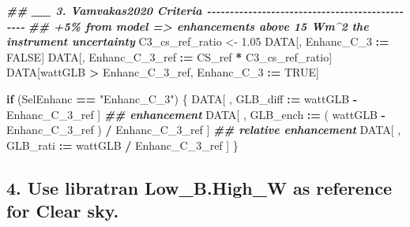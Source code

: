 \documentclass[
  10pt,
  a4paper,oneside]{article}
\newenvironment{Shaded}{\begin{snugshade}}{\end{snugshade}}
\newcommand{\ConstantTok}[1]{\textcolor[rgb]{0.56,0.35,0.01}{#1}}
\newcommand{\ControlFlowTok}[1]{\textcolor[rgb]{0.13,0.29,0.53}{\textbf{#1}}}
\newcommand{\DocumentationTok}[1]{\textcolor[rgb]{0.56,0.35,0.01}{\textbf{\textit{#1}}}}
\newcommand{\FloatTok}[1]{\textcolor[rgb]{0.00,0.00,0.81}{#1}}
\newcommand{\NormalTok}[1]{#1}
\newcommand{\OtherTok}[1]{\textcolor[rgb]{0.56,0.35,0.01}{#1}}
\newcommand{\SpecialCharTok}[1]{\textcolor[rgb]{0.81,0.36,0.00}{\textbf{#1}}}
\newcommand{\StringTok}[1]{\textcolor[rgb]{0.31,0.60,0.02}{#1}}
\begin{document}
\begin{Shaded}
\begin{Highlighting}[]
\DocumentationTok{\#\# \_\_ 3. Vamvakas2020  Criteria  {-}{-}{-}{-}{-}{-}{-}{-}{-}{-}{-}{-}{-}{-}{-}{-}{-}{-}{-}{-}{-}{-}{-}{-}{-}{-}{-}{-}{-}{-}{-}{-}{-}{-}{-}{-}{-}{-}{-}{-}{-}{-}{-}{-}{-}{-}{-}}
\DocumentationTok{\#\# +5\% from model =\textgreater{} enhancements above 15 Wm\^{}2 the instrument uncertainty}
\NormalTok{C3\_cs\_ref\_ratio }\OtherTok{\textless{}{-}} \FloatTok{1.05}
\NormalTok{DATA[, Enhanc\_C\_3 }\SpecialCharTok{:=} \ConstantTok{FALSE}\NormalTok{]}
\NormalTok{DATA[, Enhanc\_C\_3\_ref }\SpecialCharTok{:=}\NormalTok{ CS\_ref }\SpecialCharTok{*}\NormalTok{ C3\_cs\_ref\_ratio]}
\NormalTok{DATA[wattGLB }\SpecialCharTok{\textgreater{}}\NormalTok{ Enhanc\_C\_3\_ref,}
\NormalTok{     Enhanc\_C\_3 }\SpecialCharTok{:=} \ConstantTok{TRUE}\NormalTok{]}

\ControlFlowTok{if}\NormalTok{ (SelEnhanc }\SpecialCharTok{==} \StringTok{"Enhanc\_C\_3"}\NormalTok{) \{}
\NormalTok{    DATA[ , GLB\_diff }\SpecialCharTok{:=}\NormalTok{   wattGLB }\SpecialCharTok{{-}}\NormalTok{ Enhanc\_C\_3\_ref                    ] }\DocumentationTok{\#\# enhancement}
\NormalTok{    DATA[ , GLB\_ench }\SpecialCharTok{:=}\NormalTok{ ( wattGLB }\SpecialCharTok{{-}}\NormalTok{ Enhanc\_C\_3\_ref ) }\SpecialCharTok{/}\NormalTok{ Enhanc\_C\_3\_ref ] }\DocumentationTok{\#\# relative enhancement}
\NormalTok{    DATA[ , GLB\_rati }\SpecialCharTok{:=}\NormalTok{   wattGLB }\SpecialCharTok{/}\NormalTok{ Enhanc\_C\_3\_ref                    ]}
\NormalTok{\}}
\end{Highlighting}
\end{Shaded}

\hypertarget{use-libratran-low_b.high_w-as-reference-for-clear-sky.}{%
\subsection{\texorpdfstring{4. Use libratran \textbf{Low\_B.High\_W} as reference for Clear sky.}{4. Use libratran Low\_B.High\_W as reference for Clear sky.}}\label{use-libratran-low_b.high_w-as-reference-for-clear-sky.}}
\end{document}

